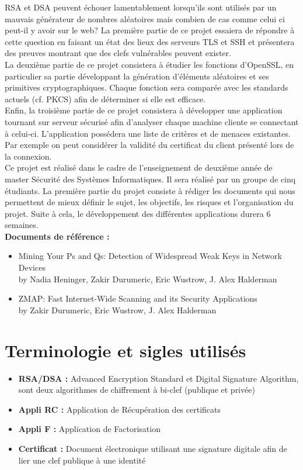 \documentclass[a4paper,11pt,french]{article}
\begin{document}
RSA et DSA peuvent échouer lamentablement lorsqu’ils sont utilisés par un mauvais générateur de nombres aléatoires mais combien de cas comme celui ci peut-il y avoir sur le web? La première partie de ce projet essaiera de répondre à cette question en faisant un état des lieux des serveurs TLS et SSH et présentera des preuves montrant que des clefs vulnérables peuvent exister.\\

La deuxième partie de ce projet consistera à étudier les fonctions d’OpenSSL, en particulier sa partie développant la génération d’éléments aléatoires et ses primitives cryptographiques. Chaque fonction sera comparée avec les standards actuels (cf. PKCS) afin de déterminer si elle est efficace.\\

Enfin, la troisième partie de ce projet consistera à développer une application tournant sur serveur sécurisé afin d’analyser chaque machine cliente se connectant à celui-ci. L’application possédera une liste de critères et de menaces existantes. Par exemple on peut considérer la validité du certificat du client présenté lors de la connexion.\\


Ce projet est réalisé dans le cadre de l’enseignement de deuxième année de master Sécurité des Systèmes Informatiques. Il sera réalisé par un groupe de cinq étudiants. La première partie du projet consiste à rédiger les documents qui nous permettent de mieux définir le sujet, les objectifs, les risques et l’organisation du projet. Suite à cela, le développement des différentes applications durera 6 semaines. \\

\textbf{Documents de référence :}
\begin{itemize}
  \item Mining Your Ps and Qs: Detection of Widespread Weak Keys in Network Devices \\
  		{by Nadia Heninger, Zakir Durumeric, Eric Wustrow, J. Alex Halderman}
  \item ZMAP: Fast Internet-Wide Scanning and its Security Applications\\
  		{by Zakir Durumeric, Eric Wustrow, J. Alex Halderman}
\end{itemize}

\section{Terminologie et sigles utilisés}
\begin{itemize}
	\item \textbf{RSA/DSA :}  Advanced Encryption Standard et Digital Signature Algorithm, sont deux algorithmes de chiffrement à bi-clef (publique et privée)
	\item \textbf{Appli RC :} Application de Récupération des certificats
	\item \textbf{Appli F :} Application de Factorisation
	\item \textbf{Certificat :} Document électronique utilisant une signature digitale afin de lier une clef publique à une identité
\end{itemize}
\end{document}
